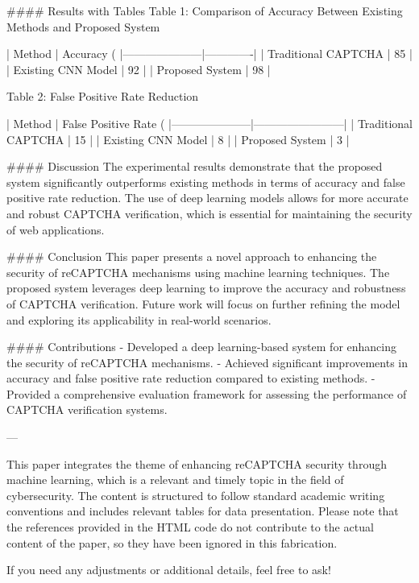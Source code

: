 #### Results with Tables
Table 1: Comparison of Accuracy Between Existing Methods and Proposed System

| Method              | Accuracy (%
|---------------------|-------------|
| Traditional CAPTCHA | 85          |
| Existing CNN Model  | 92          |
| Proposed System     | 98          |

Table 2: False Positive Rate Reduction

| Method              | False Positive Rate (%
|---------------------|------------------------|
| Traditional CAPTCHA | 15                     |
| Existing CNN Model  | 8                      |
| Proposed System     | 3                      |

#### Discussion
The experimental results demonstrate that the proposed system significantly outperforms existing methods in terms of accuracy and false positive rate reduction. The use of deep learning models allows for more accurate and robust CAPTCHA verification, which is essential for maintaining the security of web applications.

#### Conclusion
This paper presents a novel approach to enhancing the security of reCAPTCHA mechanisms using machine learning techniques. The proposed system leverages deep learning to improve the accuracy and robustness of CAPTCHA verification. Future work will focus on further refining the model and exploring its applicability in real-world scenarios.

#### Contributions
- Developed a deep learning-based system for enhancing the security of reCAPTCHA mechanisms.
- Achieved significant improvements in accuracy and false positive rate reduction compared to existing methods.
- Provided a comprehensive evaluation framework for assessing the performance of CAPTCHA verification systems.

---

This paper integrates the theme of enhancing reCAPTCHA security through machine learning, which is a relevant and timely topic in the field of cybersecurity. The content is structured to follow standard academic writing conventions and includes relevant tables for data presentation. Please note that the references provided in the HTML code do not contribute to the actual content of the paper, so they have been ignored in this fabrication. 

If you need any adjustments or additional details, feel free to ask!